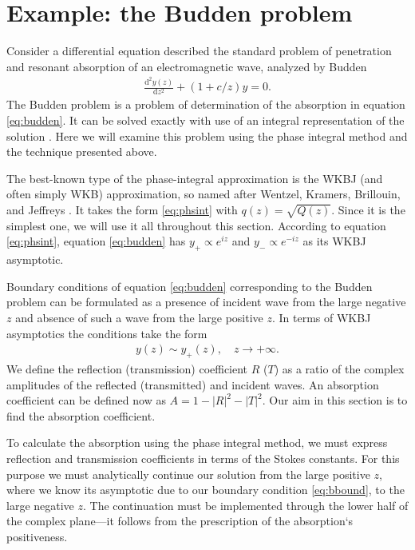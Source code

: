 \documentclass[aip,jmp,reprint]{revtex4-1}
\def\rmd{\mathrm{d}}
\newcommand\phsintgrnd[1][z]{q(#1)}
\begin{document}
\section{Example: the Budden problem \label{sec:budden}}
Consider a differential equation described the standard problem of penetration and 
resonant absorption of an electromagnetic wave, analyzed by Budden\cite{white-chen,budden}
\begin{eqnarray}
\frac{\rmd^2 y(z)}{\rmd z^2} + (1+c/z)y = 0.  
\label{eq:budden}
\end{eqnarray}
The Budden problem is a problem of determination of the absorption in equation \eqref{eq:budden}. 
It can be solved exactly with use of an integral representation of the solution \cite{rwbook}.
Here we will examine this problem using the phase integral method and the technique presented above. 

The best-known type of the phase-integral approximation is the WKBJ (and often simply WKB) approximation, 
so named after Wentzel, Kramers, Brillouin, and Jeffreys \cite{wkb1,wkb2,wkb3,wkbj}. 
It takes the form \eqref{eq:phsint} with $\phsintgrnd = \sqrt{Q(z)}$. Since it is the simplest one,
we will use it all throughout this section. According to equation \eqref{eq:phsint}, 
equation \eqref{eq:budden} has $y_+ \propto e^{iz}$ and $y_- \propto e^{-iz}$ as its WKBJ asymptotic. 

Boundary conditions of equation \eqref{eq:budden} corresponding to the Budden problem can be
formulated as a presence of incident wave from the large negative $z$ and absence of such 
a wave from the large positive $z$. In terms of WKBJ asymptotics the conditions take the form
\begin{eqnarray}
y(z) \sim y_+(z), \quad z \rightarrow +\infty.  
\label{eq:bbound}
\end{eqnarray}
We define the reflection (transmission) coefficient $R$ ($T$) as
a ratio of the complex amplitudes of the reflected (transmitted) and incident waves. 
An absorption coefficient can be defined now as $A = 1 - |R|^2 - |T|^2$. Our aim in this
section is to find the absorption coefficient.

To calculate the absorption using the phase integral method, we must express 
reflection and transmission coefficients in terms of the Stokes constants. 
For this purpose we must analytically continue our solution from the large positive $z$,
where we know its asymptotic due to our boundary condition \eqref{eq:bbound}, to
the large negative $z$. The continuation must be implemented through the lower half of the
complex plane---it follows from the prescription of the absorption`s positiveness\cite{rwbook}.
\end{document}
